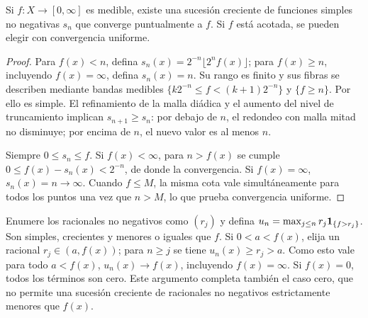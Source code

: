 \begin{teorema}\label{teo:v2-aproxsimple}
Si $f:X\to[0,\infty]$ es medible, existe una sucesión creciente de funciones simples no negativas $s_n$ que converge puntualmente a $f$. Si $f$ está acotada, se pueden elegir con convergencia uniforme.
\end{teorema}
\begin{proof}
Para $f(x)<n$, defina $s_n(x)=2^{-n}\lfloor2^nf(x)\rfloor$; para $f(x)\ge n$, incluyendo $f(x)=\infty$, defina $s_n(x)=n$. Su rango es finito y sus fibras se describen mediante bandas medibles $\{k2^{-n}\le f<(k+1)2^{-n}\}$ y $\{f\ge n\}$. Por ello es simple. El refinamiento de la malla diádica y el aumento del nivel de truncamiento implican $s_{n+1}\ge s_n$: por debajo de $n$, el redondeo con malla mitad no disminuye; por encima de $n$, el nuevo valor es al menos $n$.

Siempre $0\le s_n\le f$. Si $f(x)<\infty$, para $n>f(x)$ se cumple $0\le f(x)-s_n(x)<2^{-n}$, de donde la convergencia. Si $f(x)=\infty$, $s_n(x)=n\to\infty$. Cuando $f\le M$, la misma cota vale simultáneamente para todos los puntos una vez que $n>M$, lo que prueba convergencia uniforme.
\end{proof}
\begin{observacion}
Enumere los racionales no negativos como $(r_j)$ y defina $u_n=\max_{j\le n}r_j\mathbf1_{\{f>r_j\}}$. Son simples, crecientes y menores o iguales que $f$. Si $0<a<f(x)$, elija un racional $r_j\in(a,f(x))$; para $n\ge j$ se tiene $u_n(x)\ge r_j>a$. Como esto vale para todo $a<f(x)$, $u_n(x)\to f(x)$, incluyendo $f(x)=\infty$. Si $f(x)=0$, todos los términos son cero. Este argumento completa también el caso cero, que no permite una sucesión creciente de racionales no negativos estrictamente menores que $f(x)$.
\end{observacion}

